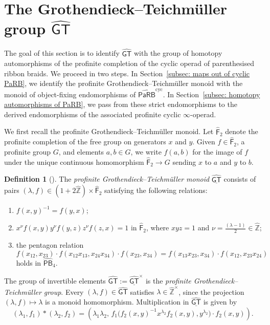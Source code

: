 \documentclass{amsart}
\newcommand{\PaRB}{\mathsf{PaRB}}
\newcommand{\GT}{\widehat{\mathsf{GT}}}
\newcommand{\PB}{\mathsf{PB}} %
\newcommand{\Free}{\mathsf{F}} %
\theoremstyle{definition}
\newtheorem{definition}[theorem]{Definition}%
\numberwithin{equation}{section}
\begin{document}
\section{The Grothendieck--Teichmüller group
\texorpdfstring{$\GT$}{GT}}
\label{sec: GT}

The goal of this section is to identify $\GT$ with the group of
homotopy automorphisms of the profinite completion of the cyclic
operad of parenthesised ribbon braids. We proceed in two steps. In
Section~\ref{subsec: maps out of cyclic PaRB}, we identify the
profinite Grothendieck--Teichmüller monoid with the monoid of
object-fixing endomorphisms of
$\widehat{\PaRB}^{\mathrm{cyc}}$. In
Section~\ref{subsec: homotopy automorphisms of PaRB}, we pass from
these strict endomorphisms to the derived endomorphisms of the
associated profinite cyclic $\infty$-operad.

We first recall the profinite Grothendieck--Teichmüller monoid. Let
$\widehat{\Free}_2$ denote the profinite completion of the free group
on generators $x$ and $y$. Given $f\in\widehat{\Free}_2$, a
profinite group $G$, and elements $a,b\in G$, we write $f(a,b)$ for
the image of $f$ under the unique continuous homomorphism
$\widehat{\Free}_2\to G$ sending $x$ to $a$ and $y$ to $b$.

\begin{definition}[{\cite{Drin}}]
\label{defn: profinite GT}
The \emph{profinite Grothendieck--Teichmüller monoid}
$\underline{\GT}$ consists of pairs
$(\lambda,f)\in
(1+2\widehat{\mathbb Z})\times\widehat{\Free}_2$
satisfying the following relations:
\begin{enumerate}
\item[\textnormal{(I)}]
$f(x,y)^{-1}=f(y,x)$;

\item[\textnormal{(II)}]
$x^\nu f(x,y)y^\nu f(y,z)z^\nu f(z,x)=1$
in $\widehat{\Free}_2$, where $xyz=1$ and $\nu =\frac{(\lambda-1)}{2}\in\widehat{\mathbb Z}$;

\item[\textnormal{(III)}]
the pentagon relation
\[f(x_{12},x_{23})
\cdot f(x_{12}x_{13},x_{24}x_{34})
\cdot f(x_{23},x_{34})
=
f(x_{13}x_{23},x_{34})
\cdot f(x_{12},x_{23}x_{24})\]
holds in $\widehat{\PB}_4$.
\end{enumerate}
\end{definition}

The group of invertible elements $\GT:=\underline{\GT}^{\times}$ is the
\emph{profinite Grothendieck--Teichmüller group}. Every $(\lambda,f)\in\GT$ satisfies $\lambda\in\widehat{\mathbb Z}^{\times}$, since the projection $(\lambda,f)\mapsto\lambda$ is a monoid homomorphism. Multiplication in $\underline{\GT}$ is given by 
\begin{equation}\label{eqn:GT multiplication}
 (\lambda_1,f_1)*(\lambda_2,f_2)
=
\left(
\lambda_1\lambda_2,\,
f_1\bigl(
f_2(x,y)^{-1}x^{\lambda_2}f_2(x,y),
y^{\lambda_2}
\bigr)\cdot f_2(x,y)
\right).   
\end{equation}
\end{document}
